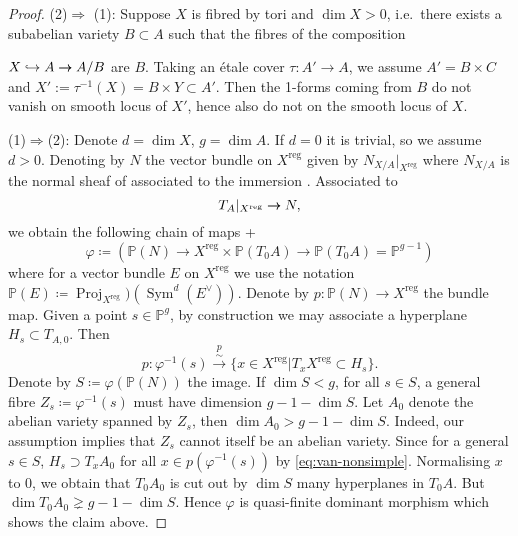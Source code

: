 \documentclass[a4paper,12pt,reqno]{amsart}
\theoremstyle{plain}
\theoremstyle{remark}
\newcommand{\C}{\mathbb C}
\newcommand{\Sym}{\operatorname{Sym}}
\newcommand{\Proj}{\operatorname{Proj}}
\renewcommand{\cong}{\simeq}
\newcommand{\bbP}{\mathbb{P}}
\newcommand{\into}{\hookrightarrow}
\newcommand{\onto}{\rightarrow\hspace*{-.14in}\rightarrow}
\DeclareMathOperator{\reg}{reg}
\begin{document}
\begin{proof}\label{proof:van-nonsimple} (2)$\Rightarrow$ (1): Suppose $X$ is fibred by tori and $\dim X>0$, i.e.\ there exists a subabelian variety $B\subset A$ such that the fibres of the composition 

$X\into A \onto A/B$ are $B$. Taking an \'etale cover $\tau: A'\to A$, we assume $A'=B\times C$ and $X':=\tau^{-1}(X)=B\times Y\subset A'$. Then the 1-forms coming from $B$ do not vanish on smooth locus of $X'$, hence also do not on the smooth locus of $X$. 

(1)$\Rightarrow$(2): Denote $d=\dim X$, $g=\dim A$. If $d=0$ it is trivial, so we assume $d>0$. Denoting by $N$ the
vector bundle on $X^{\reg}$ given by $N_{X/A}|_{X^{\reg}}$ where $N_{X/A}$ is the normal sheaf of associated to the immersion
 \cite[\href{https://stacks.math.columbia.edu/tag/01R1}{Tag 01R1}]{stacks-project}. Associated to \[T_A|_{X^{\reg}}\onto N,\]
we obtain the following chain of maps
+\[\varphi\coloneqq (\bbP(N) \to 	X^{\reg}\times \bbP(T_0{A}) \to \bbP(T_0A)=\bbP^{g-1})\]
where for a vector bundle $E$ on $X^{\reg}$ we use the notation $\bbP(E) \coloneqq \Proj_{X^{\reg}})(\Sym^d(E^{\vee}))$.
Denote by $p\colon \bbP(N)\to X^{\reg}$ the bundle map. Given
a point $s\in \bbP^g$, by construction we may associate a hyperplane $H_s\subset T_{A,0}$. Then
\begin{equation}
p\colon \varphi^{-1}(s) \overset{p}{\xrightarrow{\sim}}  \{x\in X^{\reg}| T_xX^{\reg} \subset H_s\}.
\label{eq:van-nonsimple}
\end{equation}
Denote by $S\coloneqq \varphi(\bbP(N))$ the image. If $\dim S<g$, for all $s\in S$, a general
 fibre $Z_s \coloneqq \varphi^{-1}(s)$
must have dimension $g - 1 - \dim S$. Let $A_0$ denote the abelian variety spanned by $Z_s$, then $\dim A_0 > g- 1 - \dim S$. Indeed,
our assumption implies that $Z_s$ cannot itself be an abelian variety. Since for a general $s\in S$, $H_s \supset T_xA_0$
for all $x\in p(\varphi^{-1}(s))$ by \eqref{eq:van-nonsimple}. Normalising $x$ to $0$, we obtain that $T_0A_0$
is cut out by $\dim S$ many hyperplanes in $T_0A$. But $\dim T_0A_0 \gneq g -1 - \dim S$. Hence $\varphi$ is quasi-finite
dominant morphism which shows the claim above.

\end{proof}
\end{document}
